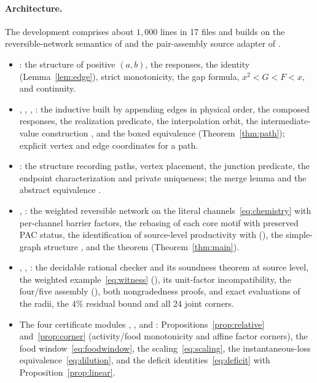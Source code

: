 \documentclass[11pt,a4paper]{article}
\theoremstyle{plain}
\theoremstyle{definition}
\theoremstyle{remark}
\begin{document}
\paragraph{Architecture.} The development comprises about $1{,}000$ lines in 17 files and builds on the reversible-network semantics of \citep{tcic2026} and the pair-assembly source adapter of \citep{tcch2026}.
\begin{itemize}[before=\sloppy]
\item {}: the structure  of positive $(a,b)$, the responses, the identity  (Lemma~\ref{lem:edge}), strict monotonicity, the gap formula, $x^2<G<F<x$, and continuity.
\item {}, , , : the inductive  built by appending edges in physical order, the composed responses, the realization predicate, the interpolation orbit, the intermediate-value construction , and the boxed equivalence  (Theorem~\ref{thm:path}); explicit vertex and edge coordinates for a path.
\item {}: the structure recording paths, vertex placement, the junction predicate, the endpoint characterization and private uniqueness; the merge lemma  and the abstract equivalence .
\item {}, : the weighted reversible network on the literal channels~\eqref{eq:chemistry} with per-channel barrier factors, the rebasing of each core motif with preserved PAC status, the identification of source-level productivity with  (), the simple-graph structure , and the theorem  (Theorem~\ref{thm:main}).
\item {}, , : the decidable rational checker  and its soundness theorem at source level, the weighted example~\eqref{eq:witness} (), its unit-factor incompatibility, the four/five assembly (), both nongradedness proofs, and exact evaluations of the radii, the $4\%$ residual bound and all 24 joint corners.
\item The four certificate modules , ,  and : Propositions~\ref{prop:relative} and~\ref{prop:corner} (activity/food monotonicity and affine factor corners), the food window~\eqref{eq:foodwindow}, the scaling~\eqref{eq:scaling}, the instantaneous-loss equivalence~\eqref{eq:dilution}, and the deficit identities~\eqref{eq:deficit} with Proposition~\ref{prop:linear}.
\end{itemize}
\end{document}
